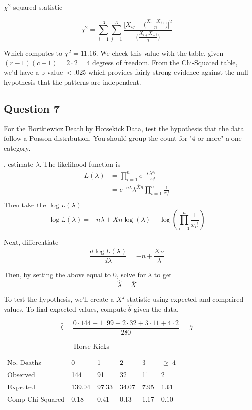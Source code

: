 \documentclass{tufte-book}
\theoremstyle{mytheoremstyle}
\theoremstyle{mylemstyle}
\theoremstyle{mydefstyle}
\begin{document}
 $\chi^2$ squared statistic

\[ \chi^2 = \sum_{i=1}^3 \sum_{j=1}^3 \frac{\Big[X_{ij} - \Big(\frac{X_{i+}X_{+j}}{n}\Big)\Big]^2}{\Big(\frac{X_{i+}X_{+j}}{n}\Big)} \]

Which computes to $\chi^2 = 11.16$.  We check this value with the table, given $(r-1)(c-1)=2\cdot 2=4$ degress of freedom.  From the Chi-Squared table, we'd have a p-value $<.025$ which provides fairly strong evidence against the null hypothesis that the patterns are independent.


\subsection{Question 7}
For the Bortkiewicz Death by Horsekick Data, test the hypothesis that the data follow a Poisson distribution.  You should group the count for "4 or more" a one category.

, estimate $\lambda$.  The likelihood function is
\begin{align*}
L(\lambda) &= \prod_{i=1}^n e^{-\lambda} \frac{\lambda^{x_i}}{x_i!} \\
&= e^{-n\lambda} \lambda^{\overline{X}n} \prod_{i=1}^n \frac{1}{x_i!}\\
\end{align*}
Then take the $\log L(\lambda)$
\[ \log L(\lambda) = -n\lambda + \overline{X}n \log(\lambda) + \log(\prod_{i=1}^n \frac{1}{x_i!})\]

Next, differentiate
\[ \frac{d \log L(\lambda)}{d \lambda} = -n + \frac{\overline{X}n}{\lambda} \]

Then, by setting the above equal to $0$, solve for $\lambda$ to get
\[ \hat{\lambda} = \overline{X} \]

To test the hypothesis, we'll create a $X^2$ statistic using expected and compaired values.  To find expected values, compute $\hat{\theta}$ given the data.

\[ \hat{\theta} = \frac{0 \cdot 144 + 1 \cdot 99 + 2 \cdot 32 + 3 \cdot 11 + 4 \cdot 2}{280} = .7 \]

\begin{table}
\centering
\caption{Horse Kicks}
\label{bort}
\begin{tabular}{l|lllll}
No. Deaths       & 0   & 1  & 2  & 3  & $\geq$ 4 \\
Observed         & 144 & 91 & 32 & 11 & 2        \\
Expected         &139.04&97.33&34.07&7.95&1.61     \\
Comp Chi-Squared &0.18&0.41&0.13&1.17&0.10
\end{tabular}
\end{table}
\end{document}
